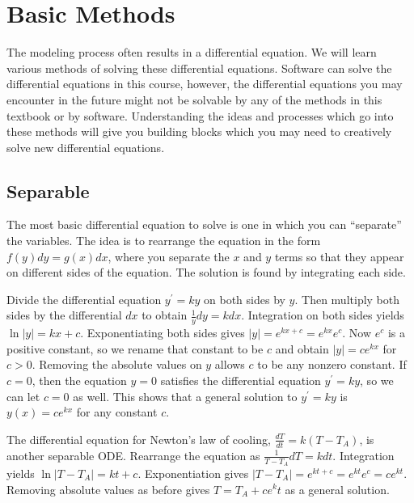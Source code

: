 \section{Basic Methods}
The modeling process often results in a differential equation. We will learn various methods of solving these differential equations. Software can solve the differential equations in this course,  however, the differential equations you may encounter in the future might not be solvable by any of the methods in this textbook or by software.  Understanding the ideas and processes which go into these methods will give you building blocks which you may need to creatively solve new differential equations.  

\subsection{Separable}
The most basic differential equation to solve is one in which you can ``separate'' the variables.  The idea is to rearrange the equation in the form $f(y)dy=g(x)dx$, where you separate the $x$ and $y$ terms so that they appear on different sides of the equation.  The solution is found by integrating each side.

\begin{example} \label{expsol} Divide the differential equation $y^\prime = ky$ on both sides by $y$. Then multiply both sides by the differential $dx$ to obtain $\frac{1}{y}dy = k dx$. Integration on both sides yields $\ln|y| = kx+c$.  Exponentiating both sides gives $|y|=e^{kx+c}=e^{kx}e^c$. Now $e^c$ is a positive constant, so we rename that constant to be $c$ and obtain $|y|=ce^{kx}$ for $c>0$.  Removing the absolute values on $y$ allows $c$ to be any nonzero constant. If $c=0$, then the equation $y=0$ satisfies the differential equation $y^\prime = ky$, so we can let $c=0$ as well. This shows that a general solution to $y^\prime = ky$ is $y(x)=ce^{kx}$ for any constant $c$.
\end{example}

\begin{example} \label{newtonsol}The differential equation for Newton's law of cooling, $ \frac{dT}{dt} = k(T-T_A)$, is another separable ODE. Rearrange the equation as $\frac{1}{T-T_A}dT = kdt$.  Integration yields $\ln|T-T_A|=kt+c$.  Exponentiation gives $|T-T_A|=e^{kt+c}=e^{kt}e^c=ce^{kt}$.  Removing absolute values as before gives $T=T_A+ce^kt$ as a general solution. 
\end{example}

